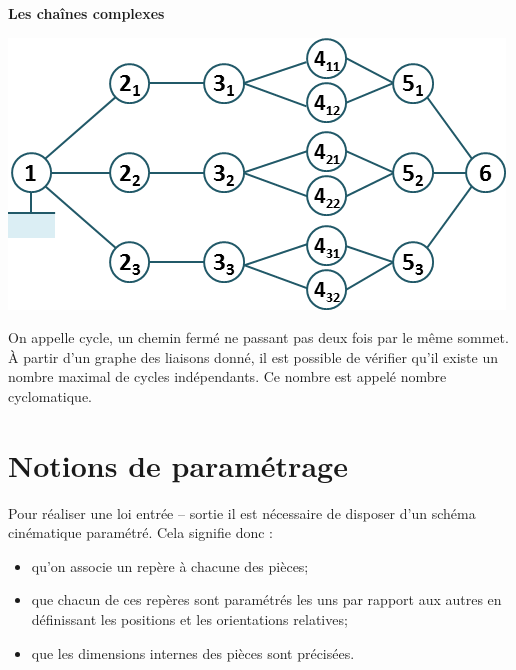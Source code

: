 \begin{defi}
\begin{multicols}{3}
\vfill\null
\columnbreak

\begin{center}
\textbf{Les chaînes complexes} 
\end{center}

\begin{center}

\vspace{-.2cm}

\includegraphics[width=.8\linewidth]{images/haptique_02}
\end{center}

\end{multicols}

On appelle cycle, un chemin fermé ne passant pas deux fois par le même sommet.
À partir d’un graphe des liaisons donné, il est possible de vérifier qu’il existe un nombre
maximal de cycles indépendants. Ce nombre est appelé nombre cyclomatique. 

\end{defi}


\section{Notions de paramétrage}
Pour réaliser une loi entrée -- sortie il est nécessaire de disposer d'un schéma cinématique paramétré. Cela signifie donc :
\begin{itemize}
\item qu'on associe un repère à chacune des pièces;
\item que chacun de ces repères sont paramétrés les uns par rapport aux autres en définissant les positions et les orientations relatives;
\item que les dimensions internes des pièces sont précisées. 
\end{itemize}

